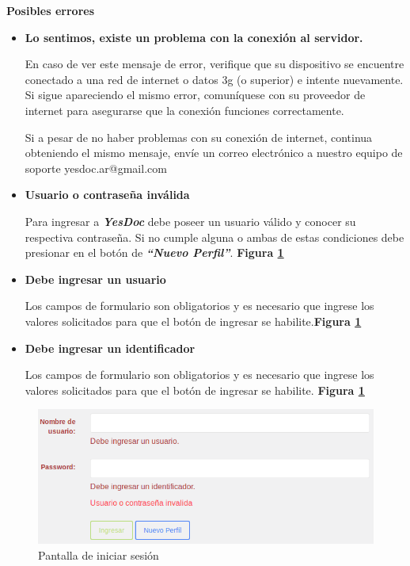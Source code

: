 \textbf{Posibles errores}
\begin{itemize}
	\item \textbf{Lo sentimos, existe un problema con la conexión al servidor.}
	
	En caso de ver este mensaje de error, verifique que su dispositivo se encuentre conectado a una red de internet o datos 3g (o superior) e intente nuevamente. Si sigue apareciendo el mismo error, comuníquese con su proveedor de internet para asegurarse que la conexión funciones correctamente.
	
	Si a pesar de no haber problemas con su conexión de internet, continua obteniendo el mismo mensaje, envíe un correo electrónico a nuestro equipo de soporte yesdoc.ar@gmail.com
	
	\item \textbf{Usuario o contraseña inválida}
	
	Para ingresar a \textbf{\textit{YesDoc}} debe poseer un usuario válido y conocer su respectiva contraseña. Si no cumple alguna o ambas de estas condiciones debe presionar en el botón de \textbf{\textit{``Nuevo Perfil''}}. \textbf{Figura \ref{mu-us_invalido_ingresar_caracteres}}
	
	\item \textbf{Debe ingresar un usuario}
	
	Los campos de formulario son obligatorios y es necesario que ingrese los valores solicitados para que el botón de ingresar se habilite.\textbf{Figura \ref{mu-us_invalido_ingresar_caracteres}}
	\item \textbf{Debe ingresar un identificador}
	
	Los campos de formulario son obligatorios y es necesario que ingrese los valores solicitados para que el botón de ingresar se habilite.	\textbf{Figura \ref{mu-us_invalido_ingresar_caracteres}}
\end{itemize}
 \begin{figure}
 	\centering
 	\includegraphics[width=.8\textwidth]{img/manual_de_usuario/us_invalido_ingresar_caracteres}
 	\caption{Pantalla de iniciar sesión}
 	\label{mu-us_invalido_ingresar_caracteres}
 \end{figure}


